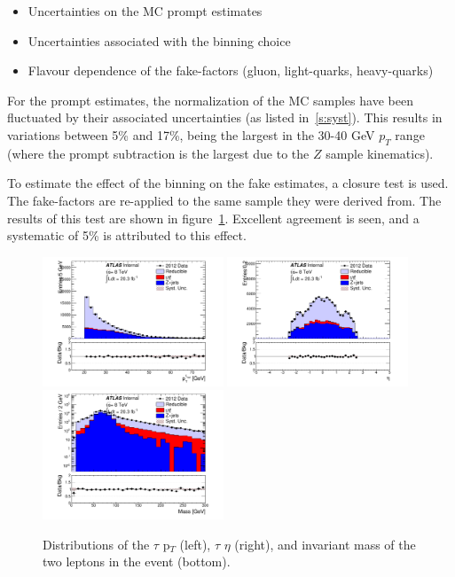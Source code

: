 \begin{itemize}
\item Uncertainties on the MC prompt estimates
\item Uncertainties associated with the binning choice
\item Flavour dependence of the fake-factors (gluon, light-quarks, heavy-quarks)
\end{itemize}

For the prompt estimates, the normalization of the MC samples have been fluctuated by
their associated uncertainties (as listed in~\ref{s:syst}).  This results in variations
between 5\% and 17\%, being the largest in the 30-40 GeV $p_{T}$ range (where the prompt
subtraction is the largest due to the $Z$ sample kinematics).

To estimate the effect of the binning on the fake estimates, a closure test is used.  The
fake-factors are re-applied to the same sample they were derived from.  The results of
this test are shown in figure~\ref{fig:tauclosure}.  Excellent agreement is seen, and a
systematic of 5\% is attributed to this effect.

\begin{figure}
\centering \includegraphics[width=0.48\textwidth]{figures/backgrounds/TauFakes_ClosurePt}
\centering \includegraphics[width=0.48\textwidth]{figures/backgrounds/TauFakes_ClosureEta}
\centering \includegraphics[width=0.48\textwidth]{figures/backgrounds/TauFakes_ClosureMass}
\caption{\label{fig:tauclosure} Distributions of the $\tau$ p$_{T}$ (left), $\tau$ $\eta$
  (right), and invariant mass of the two leptons in the event (bottom).}
\end{figure}


